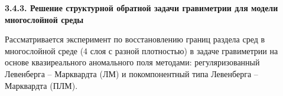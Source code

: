 % 

\newpage
{\bfseries 3.4.3. Решение структурной обратной задачи гравиметрии для модели многослойной среды} 

Рассматривается эксперимент по восстановлению границ раздела сред в многослойной среде (4 слоя с разной плотностью) в задаче гравиметрии на основе квазиреального аномального поля методами: регуляризованный Левенберга -- Марквардта (ЛМ) и покомпонентный типа Левенберга -- Марквардта (ПЛМ).

